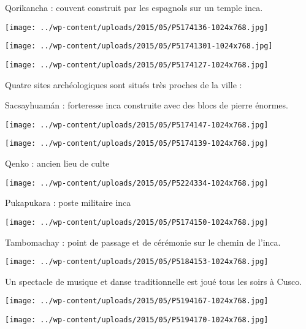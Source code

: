 Qorikancha : couvent construit par les espagnols sur un temple inca. 
\begin{center} \texttt{[image: ../wp-content/uploads/2015/05/P5174136-1024x768.jpg]} \end{center}
\begin{center} \texttt{[image: ../wp-content/uploads/2015/05/P51741301-1024x768.jpg]} \end{center}
\begin{center} \texttt{[image: ../wp-content/uploads/2015/05/P5174127-1024x768.jpg]} \end{center}
\pagebreak

Quatre sites archéologiques sont situés très proches de la ville : 

Sacsayhuamán : forteresse inca construite avec des blocs de pierre énormes. 
\begin{center} \texttt{[image: ../wp-content/uploads/2015/05/P5174147-1024x768.jpg]} \end{center}
\begin{center} \texttt{[image: ../wp-content/uploads/2015/05/P5174139-1024x768.jpg]} \end{center}
\pagebreak

Qenko : ancien lieu de culte 
\begin{center} \texttt{[image: ../wp-content/uploads/2015/05/P5224334-1024x768.jpg]} \end{center}

Pukapukara : poste militaire inca 
\begin{center} \texttt{[image: ../wp-content/uploads/2015/05/P5174150-1024x768.jpg]} \end{center}
\pagebreak

Tambomachay : point de passage et de cérémonie sur le chemin de l'inca. 
\begin{center} \texttt{[image: ../wp-content/uploads/2015/05/P5184153-1024x768.jpg]} \end{center}

Un spectacle de musique et danse traditionnelle est joué tous les soirs à Cusco. 
\begin{center} \texttt{[image: ../wp-content/uploads/2015/05/P5194167-1024x768.jpg]} \end{center}
\begin{center} \texttt{[image: ../wp-content/uploads/2015/05/P5194170-1024x768.jpg]} \end{center}

